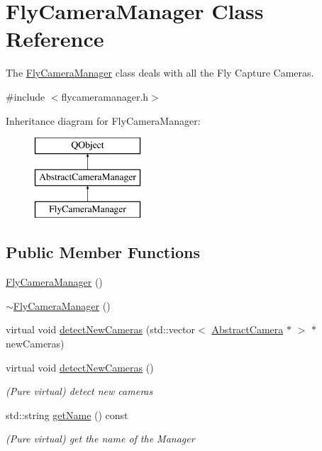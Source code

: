 \hypertarget{class_fly_camera_manager}{}\section{Fly\+Camera\+Manager Class Reference}
\label{class_fly_camera_manager}


The \mbox{\hyperlink{class_fly_camera_manager}{Fly\+Camera\+Manager}} class deals with all the Fly Capture Cameras.  




{\ttfamily \#include $<$flycameramanager.\+h$>$}

Inheritance diagram for Fly\+Camera\+Manager\+:\begin{figure}[H]
\begin{center}
\leavevmode
\includegraphics[height=3.000000cm]{class_fly_camera_manager}
\end{center}
\end{figure}
\subsection*{Public Member Functions}
\begin{DoxyCompactItemize}
\item 
\mbox{\hyperlink{class_fly_camera_manager_aae844953f01b9ee53219968e280cd8d9}{Fly\+Camera\+Manager}} ()
\item 
\mbox{\hyperlink{class_fly_camera_manager_a302cd47f5244d8fbcd2f1cdde52b92f6}{$\sim$\+Fly\+Camera\+Manager}} ()
\item 
virtual void \mbox{\hyperlink{class_fly_camera_manager_aab72966a50baaf966817c7f1265341a8}{detect\+New\+Cameras}} (std\+::vector$<$ \mbox{\hyperlink{class_abstract_camera}{Abstract\+Camera}} $\ast$ $>$ $\ast$new\+Cameras)
\item 
virtual void \mbox{\hyperlink{class_fly_camera_manager_a0f2138fb094303db2da4b8dee7f1fba8}{detect\+New\+Cameras}} ()
\begin{DoxyCompactList}\small\item\em (Pure virtual) detect new cameras \end{DoxyCompactList}\item 
std\+::string \mbox{\hyperlink{class_fly_camera_manager_a4e368cea1f4cedf26b653518c75c1433}{get\+Name}} () const
\begin{DoxyCompactList}\small\item\em (Pure virtual) get the name of the Manager \end{DoxyCompactList}\end{DoxyCompactItemize}
